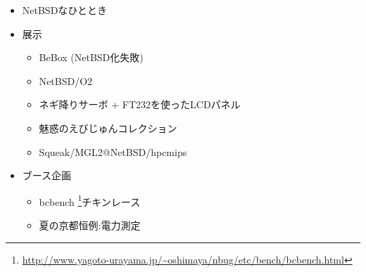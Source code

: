 \documentclass[notumble,combine]{leaflet}
\begin{document}
\begin{itemize}
\item NetBSDなひととき
\item 展示
\begin{itemize}
\item BeBox (NetBSD化失敗)
\item NetBSD/O2
\item ネギ降りサーボ + FT232を使ったLCDパネル
\item 魅惑のえびじゅんコレクション
\item Squeak/MGL2@NetBSD/hpcmips
\end{itemize}
\item ブース企画
\begin{itemize}
\item bcbench \footnote{\url{http://www.yagoto-urayama.jp/~oshimaya/nbug/etc/bench/bcbench.html}}チキンレース
\item 夏の京都恒例:電力測定
\end{itemize}
\end{itemize}
\end{document}
